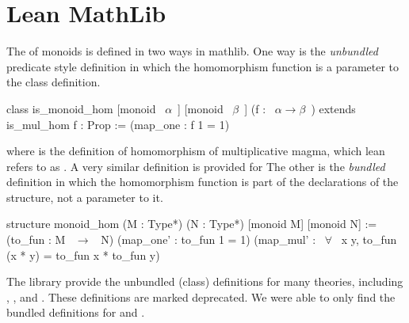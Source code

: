 \section{Lean MathLib}
The \href{https://github.com/leanprover-community/mathlib/blob/4bb8d4475f897c8997100d31fe84b33050444374/src/algebra/group/hom.lean}
{} 
of monoids is defined in two ways in mathlib. 
One way is the \emph{unbundled} predicate style definition in which the homomorphism function is a parameter to the class definition.  
\begin{leancode} 
class is_monoid_hom [monoid ~$\alpha$~] [monoid ~$\beta$~] (f : ~$\alpha \to \beta$~) 
   extends is_mul_hom f : Prop :=
    (map_one : f 1 = 1)
\end{leancode} 
\noindent where  is the definition of homomorphism of multiplicative magma, which lean refers to as . A very similar definition is provided for 
The other is the \emph{bundled} definition in which the homomorphism function is part of the declarations of the structure, not a parameter to it. 
\begin{leancode}     
structure monoid_hom (M : Type*) (N : Type*) [monoid M] [monoid N] :=
  (to_fun : M ~$\to$~ N)
  (map_one' : to_fun 1 = 1)
  (map_mul' : ~$\forall$~ x y, to_fun (x * y) = to_fun x * to_fun y)    
\end{leancode} 
The library provide the unbundled (class) definitions for many theories, including , , and . These definitions are marked deprecated. We were able to only find the bundled definitions for 
\href{https://github.com/leanprover-community/mathlib/blob/4bb8d4475f897c8997100d31fe84b33050444374/src/algebra/group/hom.lean}
{} and 
\href{https://github.com/leanprover-community/mathlib/blob/4bb8d4475f897c8997100d31fe84b33050444374/src/algebra/ring.lean}
{}. 

